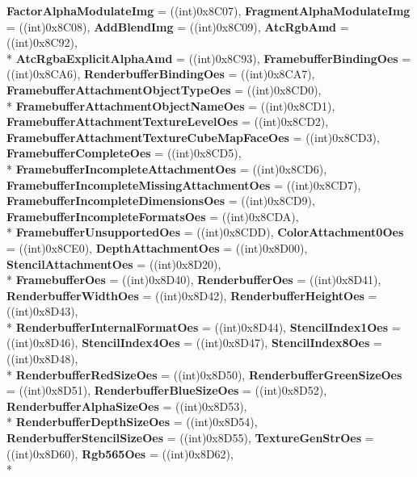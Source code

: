 \begin{DoxyCompactItemize}
{\bfseries Factor\-Alpha\-Modulate\-Img} = ((int)0x8\-C07), 
{\bfseries Fragment\-Alpha\-Modulate\-Img} = ((int)0x8\-C08), 
{\bfseries Add\-Blend\-Img} = ((int)0x8\-C09), 
{\bfseries Atc\-Rgb\-Amd} = ((int)0x8\-C92), 
\\*
{\bfseries Atc\-Rgba\-Explicit\-Alpha\-Amd} = ((int)0x8\-C93), 
{\bfseries Framebuffer\-Binding\-Oes} = ((int)0x8\-C\-A6), 
{\bfseries Renderbuffer\-Binding\-Oes} = ((int)0x8\-C\-A7), 
{\bfseries Framebuffer\-Attachment\-Object\-Type\-Oes} = ((int)0x8\-C\-D0), 
\\*
{\bfseries Framebuffer\-Attachment\-Object\-Name\-Oes} = ((int)0x8\-C\-D1), 
{\bfseries Framebuffer\-Attachment\-Texture\-Level\-Oes} = ((int)0x8\-C\-D2), 
{\bfseries Framebuffer\-Attachment\-Texture\-Cube\-Map\-Face\-Oes} = ((int)0x8\-C\-D3), 
{\bfseries Framebuffer\-Complete\-Oes} = ((int)0x8\-C\-D5), 
\\*
{\bfseries Framebuffer\-Incomplete\-Attachment\-Oes} = ((int)0x8\-C\-D6), 
{\bfseries Framebuffer\-Incomplete\-Missing\-Attachment\-Oes} = ((int)0x8\-C\-D7), 
{\bfseries Framebuffer\-Incomplete\-Dimensions\-Oes} = ((int)0x8\-C\-D9), 
{\bfseries Framebuffer\-Incomplete\-Formats\-Oes} = ((int)0x8\-C\-D\-A), 
\\*
{\bfseries Framebuffer\-Unsupported\-Oes} = ((int)0x8\-C\-D\-D), 
{\bfseries Color\-Attachment0\-Oes} = ((int)0x8\-C\-E0), 
{\bfseries Depth\-Attachment\-Oes} = ((int)0x8\-D00), 
{\bfseries Stencil\-Attachment\-Oes} = ((int)0x8\-D20), 
\\*
{\bfseries Framebuffer\-Oes} = ((int)0x8\-D40), 
{\bfseries Renderbuffer\-Oes} = ((int)0x8\-D41), 
{\bfseries Renderbuffer\-Width\-Oes} = ((int)0x8\-D42), 
{\bfseries Renderbuffer\-Height\-Oes} = ((int)0x8\-D43), 
\\*
{\bfseries Renderbuffer\-Internal\-Format\-Oes} = ((int)0x8\-D44), 
{\bfseries Stencil\-Index1\-Oes} = ((int)0x8\-D46), 
{\bfseries Stencil\-Index4\-Oes} = ((int)0x8\-D47), 
{\bfseries Stencil\-Index8\-Oes} = ((int)0x8\-D48), 
\\*
{\bfseries Renderbuffer\-Red\-Size\-Oes} = ((int)0x8\-D50), 
{\bfseries Renderbuffer\-Green\-Size\-Oes} = ((int)0x8\-D51), 
{\bfseries Renderbuffer\-Blue\-Size\-Oes} = ((int)0x8\-D52), 
{\bfseries Renderbuffer\-Alpha\-Size\-Oes} = ((int)0x8\-D53), 
\\*
{\bfseries Renderbuffer\-Depth\-Size\-Oes} = ((int)0x8\-D54), 
{\bfseries Renderbuffer\-Stencil\-Size\-Oes} = ((int)0x8\-D55), 
{\bfseries Texture\-Gen\-Str\-Oes} = ((int)0x8\-D60), 
{\bfseries Rgb565\-Oes} = ((int)0x8\-D62), 
\\*

\end{DoxyCompactItemize}
